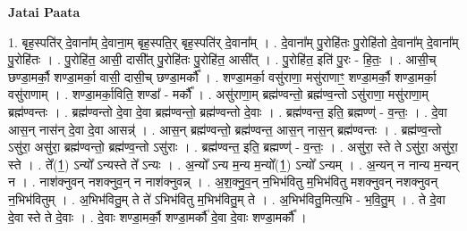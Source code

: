 \documentclass[17pt]{extarticle}
\begin{document}
\textbf{Jatai Paata} \newline

1. बृह॒स्पति॑र् दे॒वाना᳚म् दे॒वाना॒म् बृह॒स्पति॒र् बृह॒स्पति॑र् दे॒वाना᳚म् । . दे॒वाना᳚म् पु॒रोहि॑तः पु॒रोहि॑तो दे॒वाना᳚म् दे॒वाना᳚म् पु॒रोहि॑तः । . पु॒रोहि॑त॒ आसी॒ दासी᳚त् पु॒रोहि॑तः पु॒रोहि॑त॒ आसी᳚त् । . पु॒रोहि॑त॒ इति॑ पु॒रः - हि॒तः॒ । . आसी॒च् छण्डा॒मर्कौ॒ शण्डा॒मर्का॒ वासी॒ दासी॒च् छण्डा॒मर्कौ᳚ । . शण्डा॒मर्का॒ वसु॑राणा॒ मसु॑राणाꣳ॒॒ शण्डा॒मर्कौ॒ शण्डा॒मर्का॒ वसु॑राणाम् । . शण्डा॒मर्का॒विति॒ शण्डा᳚ - मर्कौ᳚ । . असु॑राणा॒म् ब्रह्म॑ण्वन्तो॒ ब्रह्म॑ण्व॒न्तो ऽसु॑राणा॒ मसु॑राणा॒म् ब्रह्म॑ण्वन्तः । . ब्रह्म॑ण्वन्तो दे॒वा दे॒वा ब्रह्म॑ण्वन्तो॒ ब्रह्म॑ण्वन्तो दे॒वाः । . ब्रह्म॑ण्वन्त॒ इति॒ ब्रह्मण्ण्॑ - व॒न्तः॒ । . दे॒वा आस॒न् नास॑न् दे॒वा दे॒वा आसन्न्॑ । . आस॒न् ब्रह्म॑ण्वन्तो॒ ब्रह्म॑ण्वन्त॒ आस॒न् नास॒न् ब्रह्म॑ण्वन्तः । . ब्रह्म॑ण्व॒न्तो ऽसु॑रा॒ असु॑रा॒ ब्रह्म॑ण्वन्तो॒ ब्रह्म॑ण्व॒न्तो ऽसु॑राः । . ब्रह्म॑ण्वन्त॒ इति॒ ब्रह्मण्ण्॑ - व॒न्तः॒ । . असु॑रा॒ स्ते ते ऽसु॑रा॒ असु॑रा॒ स्ते । . ते᳚(1॒) ऽन्यो᳚ ऽन्यस्ते ते᳚ ऽन्यः । . अ॒न्यो᳚ ऽन्य म॒न्य म॒न्यो᳚(1॒) ऽन्यो᳚ ऽन्यम् । . अ॒न्यन् न नान्य म॒न्यन् न । . नाश॑क्नुवन् नशक्नुव॒न् न नाश॑क्नुवन्न् । . अ॒श॒क्नु॒व॒न् न॒भिभ॑वितु म॒भिभ॑वितु मशक्नुवन् नशक्नुवन् न॒भिभ॑वितुम् । . अ॒भिभ॑वितु॒म् ते ते॑ ऽभिभ॑वितु म॒भिभ॑वितु॒म् ते । . अ॒भिभ॑वितु॒मित्य॒भि - भ॒वि॒तु॒म् । . ते दे॒वा दे॒वा स्ते ते दे॒वाः । . दे॒वाः शण्डा॒मर्कौ॒ शण्डा॒मर्कौ॑ दे॒वा दे॒वाः शण्डा॒मर्कौ᳚ । \newline
\end{document}
